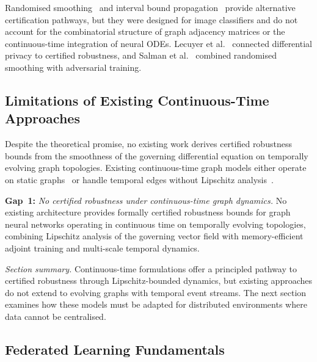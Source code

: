 Randomised smoothing~\cite{Cohen2019} and interval bound propagation~\cite{Gowal2019} provide alternative certification pathways, but they were designed for image classifiers and do not account for the combinatorial structure of graph adjacency matrices or the continuous-time integration of neural ODEs. Lecuyer et al.~\cite{Lecuyer2019} connected differential privacy to certified robustness, and Salman et al.~\cite{Salman2019} combined randomised smoothing with adversarial training.

\subsection{Limitations of Existing Continuous-Time Approaches}

Despite the theoretical promise, no existing work derives certified robustness bounds from the smoothness of the governing differential equation on temporally evolving graph topologies. Existing continuous-time graph models either operate on static graphs~\cite{Chamberlain2021} or handle temporal edges without Lipschitz analysis~\cite{Xu2020tgat,Rossi2020,Pei2020tgn,Kazemi2020,Wang2021tedic}.

\noindent\textbf{Gap~1:} \emph{No certified robustness under continuous-time graph dynamics.} No existing architecture provides formally certified robustness bounds for graph neural networks operating in continuous time on temporally evolving topologies, combining Lipschitz analysis of the governing vector field with memory-efficient adjoint training and multi-scale temporal dynamics.

\medskip
\noindent\textit{Section summary.} Continuous-time formulations offer a principled pathway to certified robustness through Lipschitz-bounded dynamics, but existing approaches do not extend to evolving graphs with temporal event streams. The next section examines how these models must be adapted for distributed environments where data cannot be centralised.

\label{sec:distributed}%

\subsection{Federated Learning Fundamentals}

